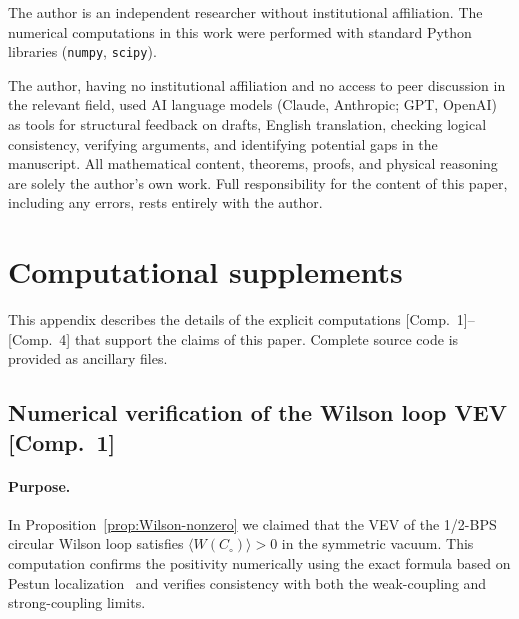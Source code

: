 \documentclass[
  aps,
  prd,
  preprint,
  groupedaddress,
  nofootinbib,
  longbibliography
]{revtex4-2}
\theoremstyle{remark}
\begin{document}
\begin{acknowledgments}
The author is an independent researcher without institutional
affiliation.
The numerical computations in this work were performed with
standard Python libraries (\texttt{numpy}, \texttt{scipy}).

The author, having no institutional affiliation and no access to
peer discussion in the relevant field, used AI language models
(Claude, Anthropic; GPT, OpenAI) as tools for structural feedback on drafts,
English translation, checking logical consistency, verifying
arguments, and identifying potential gaps in the manuscript.
All mathematical content, theorems, proofs, and physical reasoning
are solely the author's own work.
Full responsibility for the content of this paper, including any
errors, rests entirely with the author.
\end{acknowledgments}

\appendix
\section{Computational supplements}\label{app:A}

This appendix describes the details of the explicit
computations [Comp.~1]--[Comp.~4] that support the claims of
this paper.
Complete source code is provided as ancillary files.

\subsection{Numerical verification of the Wilson loop VEV
  [Comp.~1]}\label{app:A1}

\paragraph{Purpose.}
In Proposition~\ref{prop:Wilson-nonzero} we claimed that the
VEV of the 1/2-BPS circular Wilson loop satisfies
$\langle W(C_\circ)\rangle>0$ in the symmetric vacuum.
This computation confirms the positivity numerically using the
exact formula based on Pestun localization~\cite{ref31} and
verifies consistency with both the weak-coupling and
strong-coupling limits.
\end{document}
